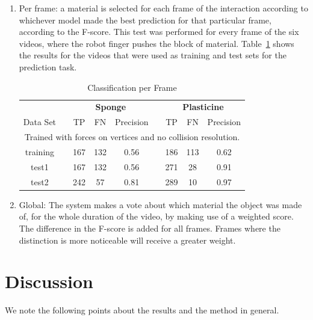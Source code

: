 \documentclass[journal]{IEEEtran}
\newcommand{\tref}[1]{Table~\ref{#1}}
\newcommand{\comment}[1]{{\color{red} #1}}
\begin{document}
\begin{enumerate}
 \item Per frame: \comment{a material is selected for each frame of the interaction according to whichever model made the best prediction for that particular frame, according to the F-score.} This test was performed for every frame of the six videos, where the robot finger pushes the block of material.  \tref{tab:classperframe} shows the results for the videos that were used as training and test sets for the prediction task.

\begin{table}[!t]
\renewcommand{\arraystretch}{1.3}
\caption{Classification per Frame}
\label{tab:classperframe}
\centering
\begin{tabular}{ccccccccc}
\hline
 & & \multicolumn{3}{c}{\bfseries Sponge} & & \multicolumn{3}{c}{\bfseries Plasticine} \\
Data Set & & TP & FN & Precision & & TP & FN & Precision\\
\hline\hline
 \multicolumn{9}{c}{Trained with forces on vertices and no collision resolution.} \\
\hline
   training & & 167 & 132 & 0.56 & & 186 & 113 & 0.62 \\
   test1 & & 167 & 132 & 0.56 & & 271 & 28 & 0.91 \\
   test2 & & 242 & 57 & 0.81 & & 289 & 10 & 0.97 \\ 
\hline
\end{tabular}
\end{table}

 \item Global: \comment{The system makes a vote about which material the object was made of, for the whole duration of the video, by making use of a weighted score.} The difference in the \comment{F-score} is added for all frames.  Frames where the distinction is more noticeable will receive a greater weight.
\end{enumerate}

\section{Discussion}
\label{sec:discussion}
We note the following points about the results and the method in general.
\end{document}
